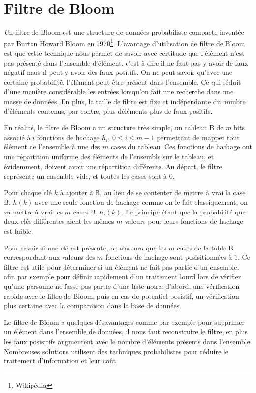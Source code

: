 \chapter{Filtre de Bloom}
	{\huge \itshape U}n filtre de Bloom est une structure de données probabiliste compacte inventée par Burton Howard Bloom en 1970\footnote{Wikipédia}. L'avantage d'utilisation de filtre de Bloom est que cette technique nous permet de savoir avec certitude que l'élément n'est pas présenté dans l'ensemble d'élément, c'est-à-dire il ne faut pas y avoir de faux négatif mais il peut y avoir des faux positifs. On ne peut savoir qu'avec une certaine probabilité, l'élément peut être présent dans l'ensemble. Ce qui réduit d'une manière considérable les entrées lorsqu'on fait une recherche dans une masse de données. En plus, la taille de filtre est fixe et indépendante du nombre d'éléments contenus, par contre, plus déléments plus de faux positifs.
	
	En réalité, le filtre de Bloom a un structure très simple, un tableau B de \textit{m} bits associé à $i$ fonctions de hachage $h_i$, $0 \leq i \leq m - 1$ permettant de mapper tout élément de l'ensemble à une des $m$ cases du tableau. Ces fonctions de hachage ont une répartition uniforme des éléments de l'ensemble sur le tableau, et évidemment, doivent avoir une répartition différente. Au départ, le filtre représente un ensemble vide, et toutes les cases sont à 0.
	
	Pour chaque clé $k$ à ajouter à B, au lieu de se contenter de mettre à vrai la case B. $h(k)$ avec une seule fonction de hachage comme on le fait classiquement, on va mettre à vrai les $m$ cases B. $h_i(k)$. Le principe étant que la probabilité que deux clés différentes aient les mêmes $m$ valeurs pour leurs fonctions de hachage est faible.
	
	Pour savoir si une clé est présente, on s'assura que les $m$ cases de la table B correspondant aux valeurs des $m$ fonctions de hachage sont posisitionnées à $1$. Ce filtre est utile pour déterminer si un élément ne fait pas partie d'un ensemble, afin par exemple pour définir rapidement d'un traitement lourd lors de vérifier qu'une personne ne fasse pas partie d'une liste noire: d'abord, une vérification rapide avec le filtre de Bloom, puis en cas de potentiel posistif, un vérification plus certaine avec la comparaison dans la base de données.
	
	Le filtre de Bloom a quelques désavantages comme par exemple pour supprimer un élément dans l'ensemble de données, il nous faut reconstruire le filtre, en plus les faux posisitifs augmentent avec le nombre d'éléments présents dans l'ensemble. Nombreuses solutions utilisent des techniques probabilistes pour réduire le traitement d'information et leur coût.
	
